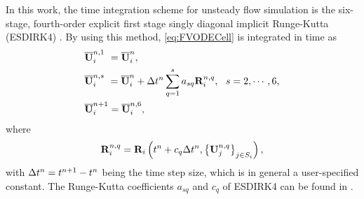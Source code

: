 In this work, the time integration scheme for unsteady flow simulation is the six-stage, fourth-order explicit first stage singly diagonal implicit Runge-Kutta (ESDIRK4) \cite{bijl2002implicitBDFvESDIRK}. By using this method, \eqref{eq:FVODECell} is integrated in time as
\begin{subequations}\label{eq:ESDIRK4}
    \begin{align}
         & \overline{\mathbf{U}}^{n,1}_i \ = \overline{\mathbf{U}}^{n}_i, \label{eq:esdirk4-1}                                                                  \\
         & \overline{\mathbf{U}}^{n,s}_i \ = \overline{\mathbf{U}}^{n}_i + \mathrm\Delta t^n \sum_{q=1}^{s} a_{sq} \mathbf{R}_i^{n,q},\ \ s = 2, \cdots, 6, \label{eq:esdirk4-s} \\
         & \overline{\mathbf{U}}^{n+1}_i = \overline{\mathbf{U}}^{n,6}_i, \label{eq:esdirk4-6}
    \end{align}
\end{subequations}
where
\begin{equation}
    \mathbf{R}^{n,q}_i  = \mathbf{R}_i \left(t^n + c_q \mathrm\Delta t^n, \left\{\mathbf{U}^{n,q}_j\right\}_{j \in S_i}\right),
\end{equation}
with $\mathrm\Delta t^n= t^{n+1} - t^n$ being the time step size, which is in general a user-specified constant.
The Runge-Kutta coefficients $a_{sq}$ and $c_q$ of ESDIRK4 can be found
in \cite{bijl2002implicitBDFvESDIRK}.

